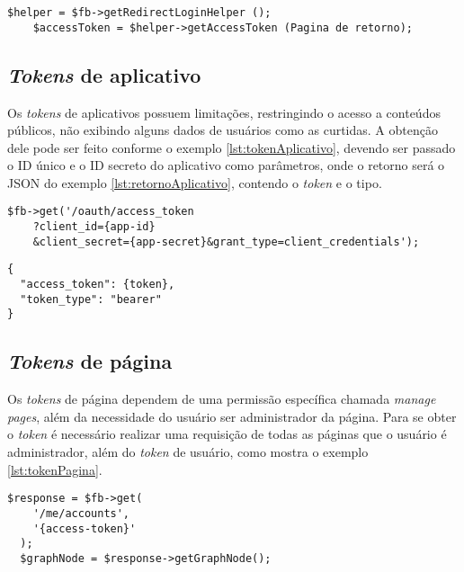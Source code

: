 \begin{lstlisting}[caption={Obtendo Token de acesso a página},label={lst:tokenUsuario}]
	$helper = $fb->getRedirectLoginHelper ();
	$accessToken = $helper->getAccessToken (Pagina de retorno);
\end{lstlisting}

\subsection{\textit{Tokens} de aplicativo}
Os \textit{tokens} de aplicativos possuem limitações, restringindo o acesso a conteúdos públicos, não exibindo alguns dados de usuários como as curtidas. A obtenção dele pode ser feito conforme o exemplo \ref{lst:tokenAplicativo}, devendo ser passado o ID único e o ID secreto do aplicativo como parâmetros, onde o retorno será o JSON do exemplo \ref{lst:retornoAplicativo}, contendo o \textit{token} e o tipo.

\begin{lstlisting}[caption={Obtendo \textit{token} de acesso de aplicativos},label={lst:tokenAplicativo}]
$fb->get('/oauth/access_token
    ?client_id={app-id}
    &client_secret={app-secret}&grant_type=client_credentials');
\end{lstlisting}

\begin{lstlisting}[caption={Retorno \textit{token} de acesso de aplicativo \ref{lst:tokenAplicativo}},label={lst:retornoAplicativo}]
{
  "access_token": {token},
  "token_type": "bearer"
}
\end{lstlisting}

\subsection{\textit{Tokens} de página}
Os \textit{tokens} de página dependem de uma permissão específica chamada \textit{manage\underline{{ }}pages}, além da necessidade do usuário ser administrador da página. Para se obter o \textit{token} é necessário realizar uma requisição de todas as páginas que o usuário é administrador, além do \textit{token} de usuário, como mostra o exemplo \ref{lst:tokenPagina}.

\begin{lstlisting}[caption={Obtendo Token de acesso a página},label={lst:tokenPagina}]
  $response = $fb->get(
    '/me/accounts',
    '{access-token}'
  );
  $graphNode = $response->getGraphNode();
\end{lstlisting}

